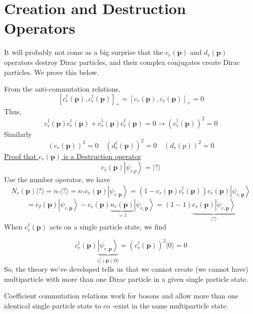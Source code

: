 \section{Creation and Destruction Operators}
It will probably not come as a big surprise that the $c_{r}(\mathbf{p})$ and $d_{r}(\mathbf{p})$ operators destroy Dirac particles, and their complex conjugates create Dirac particles. We prove this below.

From the anti-commutation relations,
\begin{equation}
\left[c_{r}^{\dagger}(\mathbf{p}), c_{r}^{\dagger}(\mathbf{p})\right]_{+}=\left[c_{r}(\mathbf{p}), c_{r}(\mathbf{p})\right]_{+}=0
\end{equation}
Thus,
\begin{equation}
c_{r}^{\dagger}(\mathbf{p}) c_{r}^{\dagger}(\mathbf{p})+c_{r}^{\dagger}(\mathbf{p}) c_{r}^{\dagger}(\mathbf{p})=0 \rightarrow\left(c_{r}^{\dagger}(\mathbf{p})\right)^{2}=0
\end{equation}
Similarly
$$\left(c_{r}(\mathbf{p})\right)^{2}=0 \quad\left(d_{r}^{\dagger}(\mathbf{p})\right)^{2}=0\quad \left(d_{r}(p)\right)^{2}=0
$$
\underline{Proof that $c_r(\mathbf{p})$ is a Destruction operator}
$$
c_{r}(\mathbf{p})\left|\psi_{r . p}\right\rangle=|?\rangle
$$
Use the number operator, we have
$$
N_{r}(\mathbf{p})|?\rangle= n_{?}|?\rangle= n_{?} c_{r}(\mathbf{p})\left|\psi_{r, \mathbf{p}}\right\rangle=\left(1-c_{r}(\mathbf{p}) c_{r}^{\dagger}(\mathbf{p})\right) c_{r}(\mathbf{p})\left|\psi_{r, \mathbf{p}}\right\rangle
$$
$$
=c_{I}(\mathbf{p})\left|\psi_{r, \mathbf{p}}\right\rangle- c_{r}(\mathbf{p}) \underbrace{n_{r}(\mathbf{p})}_{=1}\left|\psi_{r, \mathbf{p}}\right\rangle=(1-1) \underbrace{c_{r}(\mathbf{p})\left|\psi_{r, \mathbf{p}}\right\rangle}_{|?\rangle}
$$
When $c_r^{\dagger}(\mathbf{p})$ acts on a single particle state, we find
\begin{qt}
\begin{equation}
c_{r}^{\dagger}(\mathbf{p}) \underbrace{\left|\psi_{r, \mathbf{p}}\right\rangle}_{c_{r}^{\dagger}(\mathbf{p})|0\rangle}=\left(c_{r}^{\dagger}(\mathbf{p})\right)^{2}|0\rangle= 0
\end{equation}
So, the theory we've developed tells us that we cannot create (we cannot have) multiparticle with more than one Dirac particle in a given single particle state.
\end{qt}

Coefficient commutation relations work for bosons and allow more than one identical single particle state to $\mathrm{co}$ -exist in the same multiparticle state.

